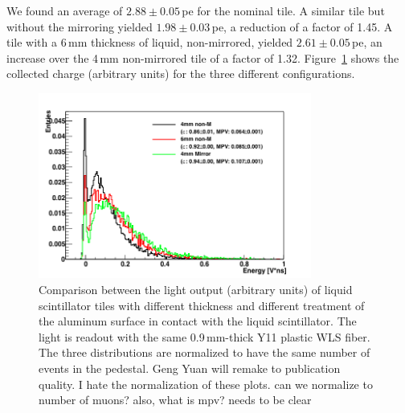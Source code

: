 \documentclass[review]{elsarticle}
\begin{document}
We found an average of 
$2.88\pm 0.05$\,pe for the nominal tile. A similar tile but without
the mirroring yielded $1.98\pm 0.03$\,pe, a reduction of a factor of
1.45. A tile with a 6\,mm thickness of liquid, non-mirrored, yielded
$2.61\pm 0.05$\,pe, an increase over the 4\,mm non-mirrored tile of a
factor of 1.32.
Figure~\ref{fig:thickness_comp} shows the collected charge (arbitrary units)
for the three different configurations.

\begin{figure}[!ht]
\begin{center}
\includegraphics[width=0.8\textwidth]{./figures/list_NEW_PROTOTYPES_all.png}
\caption{Comparison between the light output (arbitrary units)
  of liquid scintillator
  tiles with different thickness and different treatment of the
  aluminum surface in contact with the liquid scintillator. The light
  is readout with the same 0.9\,mm-thick Y11 plastic WLS fiber. The
  three distributions are normalized to have the same number of events
  in the pedestal.{\color{red} Geng Yuan will remake to publication quality.  I hate the normalization of these plots.  can we normalize to number of muons?  also, what is mpv?   needs to be clear}}
\label{fig:thickness_comp}
\end{center}
\end{figure}
\end{document}
